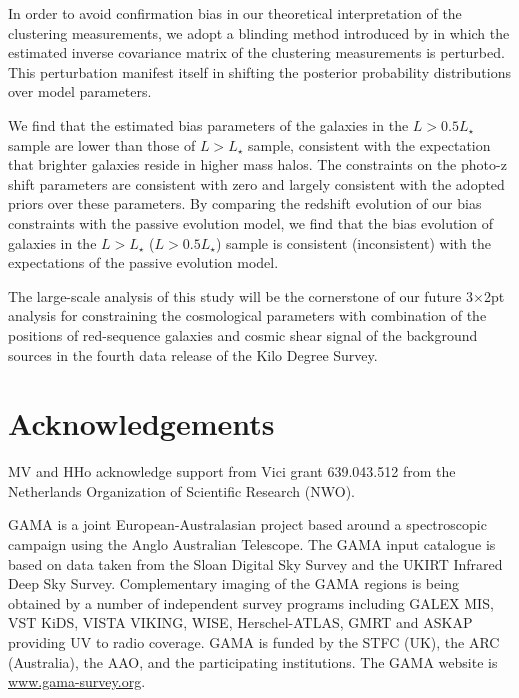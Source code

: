 \documentclass[fleqn,usenatbib,useAMS]{mnras}
\begin{document}
In order to avoid confirmation bias in our theoretical interpretation of the clustering measurements, we adopt a blinding method introduced by \citet{sellentin2019} in which the estimated inverse covariance matrix of the clustering measurements is perturbed. This perturbation manifest itself in shifting the posterior probability distributions over model parameters. 

We find that the estimated bias parameters of the galaxies in the $L>0.5L_{\star}$ sample are lower than those of $L>L_{\star}$ sample, consistent with the expectation that brighter galaxies reside in higher mass halos. The constraints on the photo-z shift parameters are consistent with zero and largely consistent with the adopted priors over these parameters. By comparing the redshift evolution of our bias constraints with the passive evolution model, we find that the bias evolution of galaxies in the $L>L_{\star}$ ($L>0.5L_{\star}$) sample is consistent (inconsistent) with the expectations of the passive evolution model. 

The large-scale analysis of this study will be the cornerstone of our future 3$\times$2pt analysis for constraining the cosmological parameters with combination of the positions of red-sequence galaxies and cosmic shear signal of the background sources in the fourth data release of the Kilo Degree Survey. 


\section*{Acknowledgements}

MV and HHo acknowledge
support from Vici grant 639.043.512 from the Netherlands
Organization of Scientific Research (NWO).

GAMA is a joint European-Australasian project based
around a spectroscopic campaign using the Anglo Australian
Telescope. The GAMA input catalogue is based on data
taken from the Sloan Digital Sky Survey and the UKIRT
Infrared Deep Sky Survey. Complementary imaging of the
GAMA regions is being obtained by a number of independent survey programs including GALEX MIS, VST
KiDS, VISTA VIKING, WISE, Herschel-ATLAS, GMRT
and ASKAP providing UV to radio coverage. GAMA is
funded by the STFC (UK), the ARC (Australia), the AAO,
and the participating institutions. The GAMA website is
\hyperlink{www.gama-survey.org}{www.gama-survey.org}.
\end{document}
